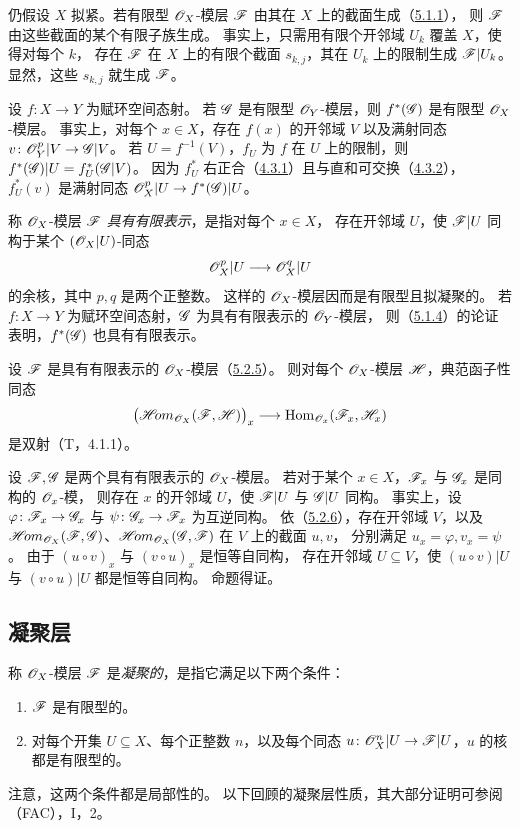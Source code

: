 仍假设 $X$ 拟紧。若有限型 $\mathscr O_X$-模层 $\mathscr F$ 由其在 $X$ 上的截面生成（\hyperlink{para:0:5.1.1}{5.1.1}），
则 $\mathscr F$ 由这些截面的某个有限子族生成。
事实上，只需用有限个开邻域 $U_k$ 覆盖 $X$，使得对每个 $k$，
存在 $\mathscr F$ 在 $X$ 上的有限个截面 $s_{k,j}$，其在 $U_k$ 上的限制生成 $\mathscr F|U_k$。
显然，这些 $s_{k,j}$ 就生成 $\mathscr F$。

设 $f\colon X\to Y$ 为赋环空间态射。
若 $\mathscr G$ 是有限型 $\mathscr O_Y$-模层，则 $f^*(\mathscr G)$ 是有限型 $\mathscr O_X$-模层。
事实上，对每个 $x\in X$，存在 $f(x)$ 的开邻域 $V$ 以及满射同态
$v\colon\mathscr O_Y^p|V\to\mathscr G|V$。
若 $U=f^{-1}(V)$，$f_U$ 为 $f$ 在 $U$ 上的限制，则
$f^*(\mathscr G)|U=f_U^*(\mathscr G|V)$。
因为 $f_U^*$ 右正合（\hyperlink{para:0:4.3.1}{4.3.1}）且与直和可交换（\hyperlink{para:0:4.3.2}{4.3.2}），
$f_U^*(v)$ 是满射同态 $\mathscr O_X^p|U\to f^*(\mathscr G)|U$。

称 $\mathscr O_X$-模层 $\mathscr F$ \emph{具有有限表示}，是指对每个 $x\in X$，
存在开邻域 $U$，使 $\mathscr F|U$ 同构于某个 $(\mathscr O_X|U)$-同态
\[
 \mathscr O_X^p|U\longrightarrow\mathscr O_X^q|U
\]
的余核，其中 $p,q$ 是两个正整数。
这样的 $\mathscr O_X$-模层因而是有限型且拟凝聚的。
若 $f\colon X\to Y$ 为赋环空间态射，$\mathscr G$ 为具有有限表示的 $\mathscr O_Y$-模层，
则（\hyperlink{para:0:5.1.4}{5.1.4}）的论证表明，$f^*(\mathscr G)$ 也具有有限表示。

设 $\mathscr F$ 是具有有限表示的 $\mathscr O_X$-模层（\hyperlink{para:0:5.2.5}{5.2.5}）。
则对每个 $\mathscr O_X$-模层 $\mathscr H$，典范函子性同态
\[
 \bigl(\mathscr{H}\!om_{\mathscr O_X}(\mathscr F,\mathscr H)\bigr)_x
 \longrightarrow\operatorname{Hom}_{\mathscr O_x}(\mathscr F_x,\mathscr H_x)
\]
是双射（T，4.1.1）。

设 $\mathscr F,\mathscr G$ 是两个具有有限表示的 $\mathscr O_X$-模层。
若对于某个 $x\in X$，$\mathscr F_x$ 与 $\mathscr G_x$ 是同构的 $\mathscr O_x$-模，
则存在 $x$ 的开邻域 $U$，使 $\mathscr F|U$ 与 $\mathscr G|U$ 同构。
事实上，设 $\varphi\colon\mathscr F_x\to\mathscr G_x$ 与 $\psi\colon\mathscr G_x\to\mathscr F_x$ 为互逆同构。
依（\hyperlink{para:0:5.2.6}{5.2.6}），存在开邻域 $V$，以及
$\mathscr{H}\!om_{\mathscr O_X}(\mathscr F,\mathscr G)$、$\mathscr{H}\!om_{\mathscr O_X}(\mathscr G,\mathscr F)$ 在 $V$ 上的截面 $u,v$，
分别满足 $u_x=\varphi,v_x=\psi$。
由于 $(u\circ v)_x$ 与 $(v\circ u)_x$ 是恒等自同构，
存在开邻域 $U\subseteq V$，使 $(u\circ v)|U$ 与 $(v\circ u)|U$ 都是恒等自同构。
命题得证。

\subsection{凝聚层}\hypertarget{heading:0:5.3}{}

称 $\mathscr O_X$-模层 $\mathscr F$ 是\emph{凝聚的}，是指它满足以下两个条件：
\begin{enumerate}[label=\alph*)]
\item $\mathscr F$ 是有限型的。
\item 对每个开集 $U\subseteq X$、每个正整数 $n$，以及每个同态
$u\colon\mathscr O_X^n|U\to\mathscr F|U$，$u$ 的核都是有限型的。
\end{enumerate}
注意，这两个条件都是局部性的。
以下回顾的凝聚层性质，其大部分证明可参阅（FAC），I，2。

